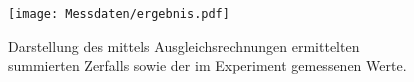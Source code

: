\begin{figure}
  \centering
  \texttt{[image: Messdaten/ergebnis.pdf]}
  \caption{Darstellung des mittels Ausgleichsrechnungen ermittelten summierten Zerfalls sowie der im Experiment gemessenen Werte.}
  \label{fig:ergebnis}
\end{figure}




